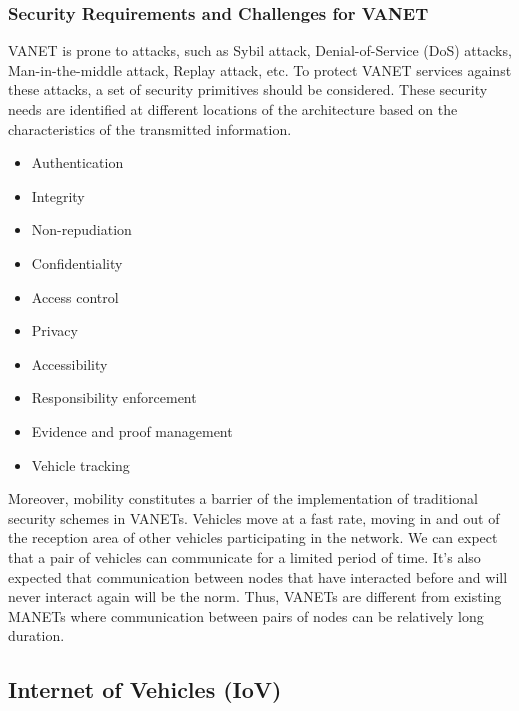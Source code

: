 			\subsubsection{Security Requirements and Challenges for VANET \cite{paul2016intelligent}}
			VANET is prone to attacks, such as Sybil attack, Denial-of-Service (DoS) attacks, Man-in-the-middle attack, Replay attack, etc. To protect VANET services against these attacks, a set of security primitives should be considered. These security needs are identified at different locations of the architecture based on the characteristics of the transmitted information. 
			\begin{itemize}
				\let\labelitemi\labelitemii
				\item Authentication
				\item Integrity
				\item Non-repudiation
				\item Confidentiality
				\item Access control
				\item Privacy
				\item Accessibility
				\item Responsibility enforcement
				\item Evidence and proof management
				\item Vehicle tracking
			\end{itemize}
			Moreover, mobility constitutes a barrier of the implementation of traditional security schemes in VANETs. Vehicles move at a fast rate, moving in and out of the reception area of other vehicles participating in the network. We can expect that a pair of vehicles can communicate for a limited period of time. It’s also expected that communication between nodes that have interacted before and will never interact again will be the norm. Thus, VANETs are different from existing MANETs where communication between pairs of nodes can be relatively long duration. 
			
			\subsection{Internet of Vehicles (IoV)}
